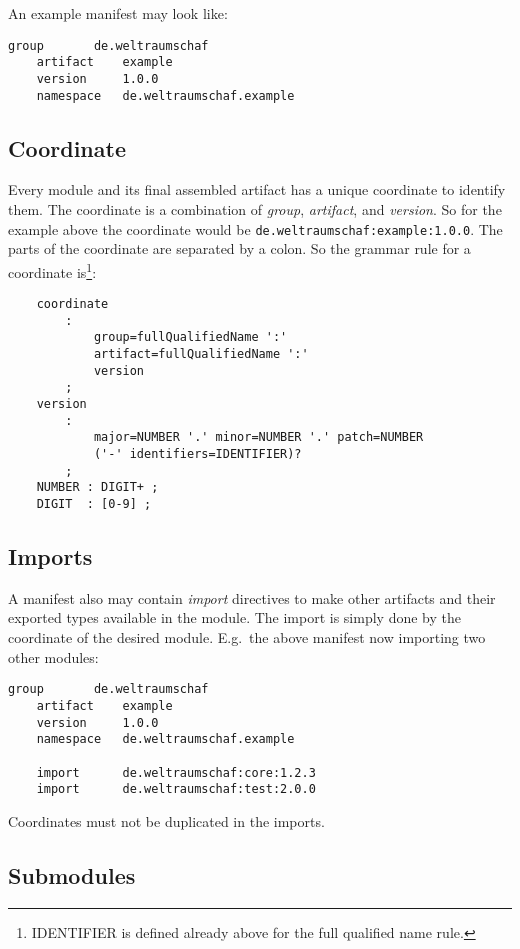 \documentclass[11pt,a4paper]{report}
\begin{document}
\noindent An example manifest may look like:

\begin{lstlisting}[language=CayThe]
    group       de.weltraumschaf
    artifact    example
    version     1.0.0
    namespace   de.weltraumschaf.example
\end{lstlisting}

\subsection{Coordinate}

Every module and its final assembled artifact has a unique coordinate to identify them. The coordinate is a combination of \textit{group}, \textit{artifact}, and \textit{version}. So for the example above the coordinate would be \texttt{de.weltraumschaf:example:1.0.0}. The parts of the coordinate are separated by a colon. So the grammar rule for a coordinate is\footnote{IDENTIFIER is defined already above for the full qualified name rule.}:

\begin{lstlisting}
    coordinate
        :
            group=fullQualifiedName ':'
            artifact=fullQualifiedName ':'
            version
        ;
    version
        : 
            major=NUMBER '.' minor=NUMBER '.' patch=NUMBER
            ('-' identifiers=IDENTIFIER)?
        ;
    NUMBER : DIGIT+ ;
    DIGIT  : [0-9] ;
\end{lstlisting}

\subsection{Imports}

A manifest also may contain \textit{import} directives to make other artifacts and their exported types available in the module. The import is simply done by the coordinate of the desired module. E.g.\ the above manifest now importing two other modules:

\begin{lstlisting}[language=CayThe]
    group       de.weltraumschaf
    artifact    example
    version     1.0.0
    namespace   de.weltraumschaf.example

    import      de.weltraumschaf:core:1.2.3
    import      de.weltraumschaf:test:2.0.0
\end{lstlisting}

Coordinates must not be duplicated in the imports.

\subsection{Submodules}
\end{document}
